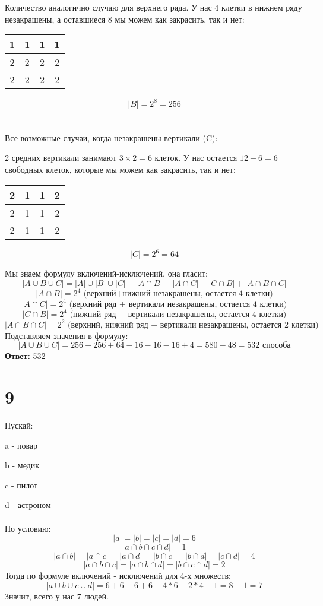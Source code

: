 \documentclass[a4paper,12pt]{article}
\begin{document}
Количество аналогично случаю для верхнего ряда.  У нас 4 клетки в нижнем ряду незакрашены, а оставшиеся 8 мы можем как закрасить, так и нет:
\begin{center}
\begin{tabular}{|c|c|c|c|}
\hline
1 &1  &1  & 1\\
\hline
 2& 2 &2  & 2 \\
\hline
 2&2  & 2  & 2 \\
\hline
\end{tabular}
\end{center}
\[
|B| = 2^8 = 256
\]
\\\\
Все возможные случаи, когда незакрашены вертикали (C):

2 средних вертикали занимают  $3 \times 2 = 6$ клеток. У нас остается $12-6 = 6 $ свободных клеток, которые мы можем как закрасить, так и нет:


\begin{center}
\begin{tabular}{|c|c|c|c|}
\hline
2&1&1 & 2\\
\hline
 2& 1&1& 2\\
\hline
 2&1 &1& 2 \\
\hline
\end{tabular}
\end{center}
\[
|C| = 2^6 = 64
\]

Мы знаем формулу включений-исключений, она гласит:
\[
|A \cup B \cup C| = |A| \cup |B| \cup |C| - |A \cap B| - |A \cap C| - |C \cap B| + |A \cap B \cap C|
\]
\[
|A \cap B| = 2^4 \text{ (верхний+нижний незакрашены, остается 4 клетки)}
\]
\[
|A \cap C| = 2^4 \text{ (верхний ряд + вертикали незакрашены, остается 4 клетки)}
\]
\[
|C \cap B| = 2^4 \text{ (нижний ряд + вертикали незакрашены, остается 4 клетки)}
\]
\[
|A \cap B \cap C| = 2^2 \text{ (верхний, нижний ряд + вертикали незакрашены, остается 2 клетки)}
\]
Подставляем значения в формулу:
\[
|A \cup B \cup C| = 256 + 256 + 64 - 16 - 16 - 16 + 4 = 580 - 48 = 532 \text{ способа} 
\]
\textbf{Ответ:} 532 
\section*{9}
 
Пускай:

a - повар

b - медик

c - пилот

d - астроном 
\\\\
По условию:
\[
|a| = |b| = |c| = |d| = 6
\]
\[
|a \cap b \cap c \cap d|  = 1
\]
\[
|a \cap b| = |a \cap c| = |a \cap d| = |b \cap c| = |b \cap d| = |c \cap d| = 4
\]
\[
|a \cap b \cap c| = |a \cap b \cap d| = |b \cap c \cap d| = 2
\]
Тогда по формуле включений - исключений для 4-х множеств:
\[
|a \cup b \cup c \cup d| = 6 + 6 + 6 + 6 - 4 * 6 + 2 * 4 - 1 = 8 - 1 = 7 
\]
Значит, всего у нас 7 людей.
\end{document}
